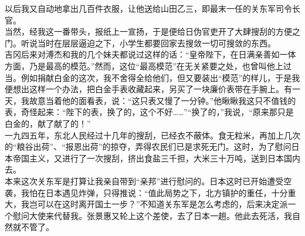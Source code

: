 以后我又自动地拿出几百件衣服，让他送给山田乙三，即最末一任的关东军司令长官。\\

当然，经我这一番带头，报纸上一宣扬，于是便给日伪官吏开了大肆搜刮的方便之门。听说当时在层层逼迫之下，小学生都要回家去搜敛一切可搜敛的东西。\\

吉冈后来对溥杰和我的几个妹夫都说过这样的话：“皇帝陛下，在日满亲善如一体方面，乃是最高的模范。”然而，这位“最高模范”在无关紧要之处，也曾叫他上过当。例如捐献白金的这次，我不舍得全给他们，但又要装出“模范”的样儿，于是我便想出这样一个办法，把白金手表收藏起来，另买了一块廉价表带在手腕上。有一天，我故意当着他的面看表，说：“这只表又慢了一分钟。”他瞅瞅我这只不值钱的表，奇怪起来：“陛下的表，换了的，这个不好……”“换了的，”我说，“原来那只是白金的，献了献了的！”\\

一九四五年，东北人民经过十几年的搜刮，已经衣不蔽体。食无粒米，再加上几次的“粮谷出荷”、“报恩出荷”的掠夺，弄得农民们已是求死无门。这时，为了慰问日本帝国主义，又进行了一次搜刮，挤出食盐三千担，大米三十万吨，送到日本国内去。\\

本来这次关东军是打算让我亲自带到“亲邦”进行慰问的。日本这时已开始遭受空袭，我怕在日本遇见炸弹，只得推说：“值此局势之下，北方镇护的重任，十分重大，我岂可以在这时离开国土一步？”不知道关东军是怎么考虑的，后来决定派一个慰问大使来代替我。张景惠又轮上这个差使，去了日本一趟。他此去死活，我自然就不管了。
